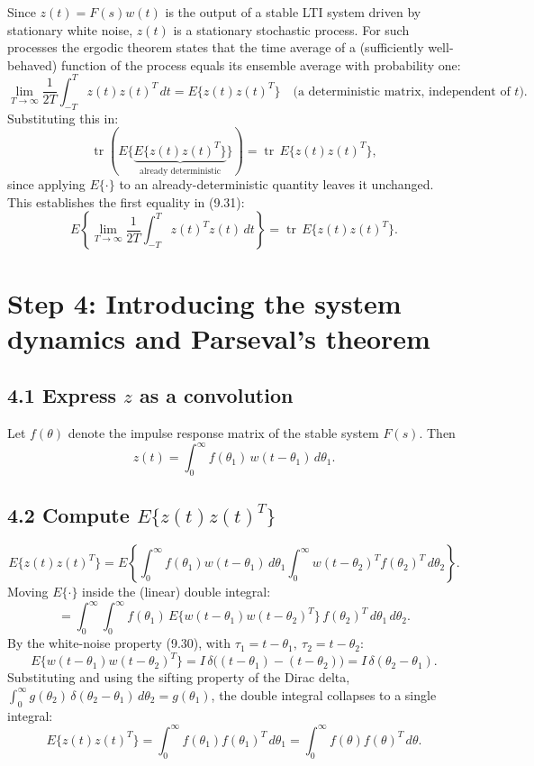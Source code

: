 Since $z(t) = F(s)w(t)$ is the output of a stable LTI system driven by stationary white noise, $z(t)$ is a stationary stochastic process. For such processes the ergodic theorem states that the time average of a (sufficiently well-behaved) function of the process equals its ensemble average with probability one:
\[
    \lim_{T\to\infty}\frac{1}{2T}\int_{-T}^{T} z(t)z(t)^T\,dt = E\{z(t)z(t)^T\} \quad \text{(a deterministic matrix, independent of } t\text{)}.
\]
Substituting this in:
\[
    \operatorname{tr}\left(E\Big\{\underbrace{E\{z(t)z(t)^T\}}_{\text{already deterministic}}\Big\}\right) = \operatorname{tr}\, E\{z(t)z(t)^T\},
\]
since applying $E\{\cdot\}$ to an already-deterministic quantity leaves it unchanged. This establishes the first equality in (9.31):
\[
    E\left\{\lim_{T\to\infty}\frac{1}{2T}\int_{-T}^{T} z(t)^Tz(t)\,dt\right\} = \operatorname{tr}\, E\{z(t)z(t)^T\}.
\]

\section*{Step 4: Introducing the system dynamics and Parseval's theorem}

\subsection*{4.1 Express $z$ as a convolution}

Let $f(\theta)$ denote the impulse response matrix of the stable system $F(s)$. Then
\[
    z(t) = \int_0^\infty f(\theta_1)\,w(t-\theta_1)\,d\theta_1.
\]

\subsection*{4.2 Compute $E\{z(t)z(t)^T\}$}

\[
    E\{z(t)z(t)^T\}
    = E\left\{\int_0^\infty f(\theta_1)w(t-\theta_1)\,d\theta_1 \int_0^\infty w(t-\theta_2)^Tf(\theta_2)^T\,d\theta_2\right\}.
\]
Moving $E\{\cdot\}$ inside the (linear) double integral:
\[
    = \int_0^\infty\!\!\int_0^\infty f(\theta_1)\,E\{w(t-\theta_1)w(t-\theta_2)^T\}\,f(\theta_2)^T\,d\theta_1\,d\theta_2.
\]
By the white-noise property (9.30), with $\tau_1 = t-\theta_1,\ \tau_2 = t-\theta_2$:
\[
    E\{w(t-\theta_1)w(t-\theta_2)^T\} = I\,\delta\big((t-\theta_1)-(t-\theta_2)\big) = I\,\delta(\theta_2-\theta_1).
\]
Substituting and using the sifting property of the Dirac delta, $\int_0^\infty g(\theta_2)\,\delta(\theta_2-\theta_1)\,d\theta_2 = g(\theta_1)$, the double integral collapses to a single integral:
\[
    E\{z(t)z(t)^T\} = \int_0^\infty f(\theta_1)f(\theta_1)^T\,d\theta_1 = \int_0^\infty f(\theta)f(\theta)^T\,d\theta.
\]

